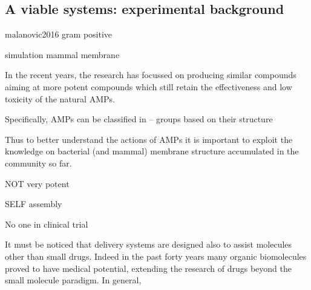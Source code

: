 \documentclass[a4paper,11pt]{extreport}
\begin{document}
\subsection{A viable systems: experimental background}
\clearpage



malanovic2016 gram positive



simulation mammal membrane \cite{Ingolfsson2014}

In the recent years, the research has focussed on producing similar compounds aiming at more potent compounds which still retain the effectiveness and low toxicity of the natural AMPs.

Specifically, AMPs can be classified in -- groups based on their structure

Thus to better understand the actions of AMPs it is important to exploit the knowledge on bacterial (and mammal) membrane structure accumulated in the community so far.

NOT very potent

SELF assembly

No one in clinical trial

It must be noticed that delivery systems are designed also to assist molecules other than small drugs. Indeed in the past forty years many organic biomolecules proved to have medical potential, extending the research of drugs beyond the small molecule paradigm. In general, 
\end{document}

